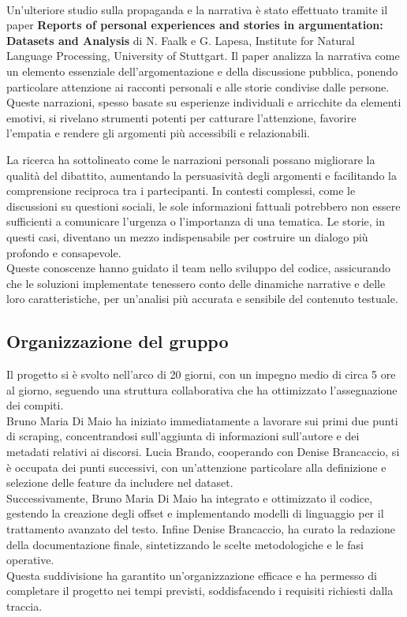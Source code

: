 \documentclass[12pt]{article}
\begin{document}
\\
Un'ulteriore studio sulla propaganda e la narrativa è stato effettuato tramite il paper \textbf{Reports of personal experiences and stories in argumentation: Datasets and Analysis} di N. Faalk e G. Lapesa, Institute for Natural Language Processing, University of Stuttgart.
Il paper analizza la narrativa come un elemento essenziale dell'argomentazione e della discussione pubblica, ponendo particolare attenzione ai racconti personali e alle storie condivise dalle persone. Queste narrazioni, spesso basate su esperienze individuali e arricchite da elementi emotivi, si rivelano strumenti potenti per catturare l'attenzione, favorire l'empatia e rendere gli argomenti più accessibili e relazionabili.\\

\newpage

La ricerca ha sottolineato come le narrazioni personali possano migliorare la qualità del dibattito, aumentando la persuasività degli argomenti e facilitando la comprensione reciproca tra i partecipanti. In contesti complessi, come le discussioni su questioni sociali, le sole informazioni fattuali potrebbero non essere sufficienti a comunicare l'urgenza o l'importanza di una tematica. Le storie, in questi casi, diventano un mezzo indispensabile per costruire un dialogo più profondo e consapevole.\\ 
Queste conoscenze hanno guidato il team nello sviluppo del codice, assicurando che le soluzioni implementate tenessero conto delle dinamiche narrative e delle loro caratteristiche, per un'analisi più accurata e sensibile del contenuto testuale.

	\subsection{Organizzazione del gruppo}
	Il progetto si è svolto nell'arco di 20 giorni, con un impegno medio di circa 5 ore al giorno, seguendo una struttura collaborativa che ha ottimizzato l'assegnazione dei compiti. \\
	Bruno Maria Di Maio ha iniziato immediatamente a lavorare sui primi due punti di scraping, concentrandosi sull'aggiunta di informazioni sull'autore e dei metadati relativi ai discorsi. Lucia Brando, cooperando con Denise Brancaccio, si è occupata dei punti successivi, con un'attenzione particolare alla definizione e selezione delle feature da includere nel dataset. \\
	Successivamente, Bruno Maria Di Maio ha integrato e ottimizzato il codice, gestendo la creazione degli offset e implementando modelli di linguaggio per il trattamento avanzato del testo. Infine Denise Brancaccio, ha curato la redazione della documentazione finale, sintetizzando le scelte metodologiche e le fasi operative.\\
	Questa suddivisione ha garantito un'organizzazione efficace e ha permesso di completare il progetto nei tempi previsti, soddisfacendo i requisiti richiesti dalla traccia.
	
\end{document}

